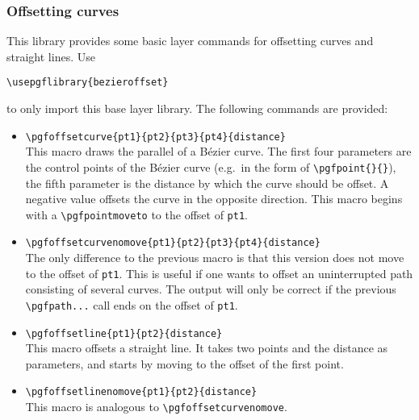 \documentclass[12pt,a4paper]{article}
\theoremstyle{definition}
\begin{document}
\subsubsection{Offsetting curves}
This library provides some basic layer commands for offsetting curves and straight lines. Use
\begin{verbatim}
\usepgflibrary{bezieroffset}
\end{verbatim}
to only import this base layer library. The following commands are provided:
\begin{itemize}
  \item \verb|\pgfoffsetcurve{pt1}{pt2}{pt3}{pt4}{distance}|\\%
    This macro draws the parallel of a Bézier curve. The first four parameters are the control points of the Bézier curve (e.g.\ in the form of \verb|\pgfpoint{}{}|), the fifth parameter is the distance by which the curve should be offset. A negative value offsets the curve in the opposite direction. This macro begins with a \verb|\pgfpointmoveto| to the offset of \texttt{pt1}.
  \item \verb|\pgfoffsetcurvenomove{pt1}{pt2}{pt3}{pt4}{distance}|\\%
    The only difference to the previous macro is that this version does not move to the offset of \texttt{pt1}. This is useful if one wants to offset an uninterrupted path consisting of several curves. The output will only be correct if the previous \verb|\pgfpath...| call ends on the offset of \texttt{pt1}.
  \item \verb|\pgfoffsetline{pt1}{pt2}{distance}|\\%
    This macro offsets a straight line. It takes two points and the distance as parameters, and starts by moving to the offset of the first point.
  \item \verb|\pgfoffsetlinenomove{pt1}{pt2}{distance}|\\%
    This macro is analogous to \verb|\pgfoffsetcurvenomove|.
\end{itemize}
\end{document}
